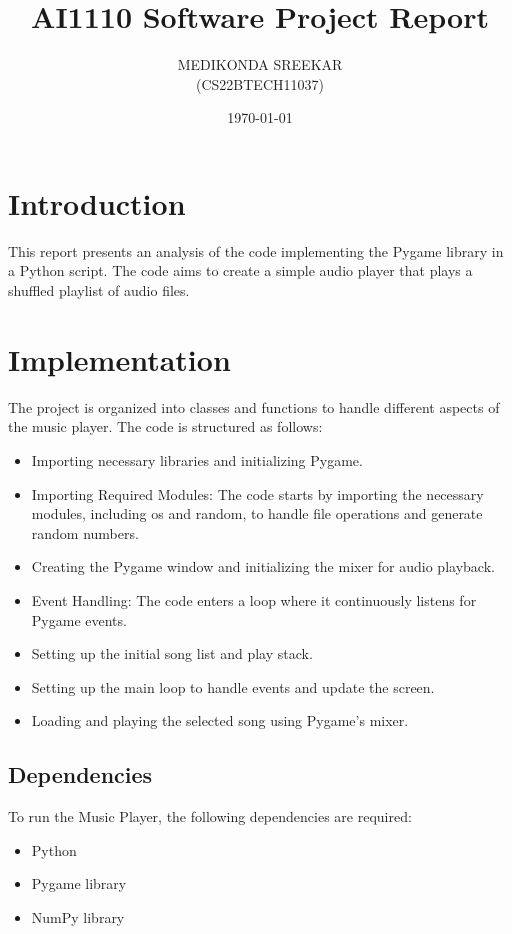 \documentclass[journal,12pt,twocolumn]{IEEEtran}
\title{AI1110 Software Project Report}
\author{MEDIKONDA SREEKAR\\ (CS22BTECH11037)}
\date{\today}
\begin{document}
\maketitle

\section{Introduction}
This report presents an analysis of the code implementing the Pygame library in a Python script. The code aims to create a simple audio player that plays a shuffled playlist of audio files. 

\section{Implementation}
The project is organized into classes and functions to handle different aspects of the music player. The code is structured as follows:

\begin{itemize}
\item Importing necessary libraries and initializing Pygame.
\item Importing Required Modules: The code starts by importing the necessary modules, including os and random, to handle file operations and generate random numbers.
\item Creating the Pygame window and initializing the mixer for audio playback.
\item Event Handling: The code enters a  loop where it continuously listens for Pygame events. 
\item Setting up the initial song list and play stack.
\item Setting up the main loop to handle events and update the screen.
\item Loading and playing the selected song using Pygame's mixer.
\end{itemize}

\subsection{Dependencies}
To run the Music Player, the following dependencies are required:

\begin{itemize}
\item Python 
\item Pygame library
\item NumPy library
\end{itemize}
\end{document}
